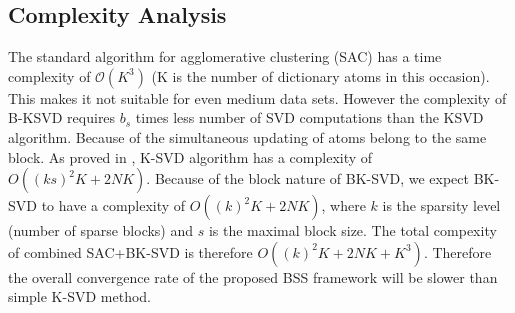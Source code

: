 \subsection{Complexity Analysis}
The standard algorithm for agglomerative clustering (SAC) has a time complexity of ${\displaystyle {\mathcal {O}}(K^{3})}$ (K is the number of dictionary atoms in this occasion). This makes it not suitable for even medium data sets. However the complexity of B-KSVD requires $b_s$ times less number of SVD computations than the KSVD algorithm. Because of the simultaneous updating of atoms belong to the same block.
As proved in \cite{OMP_KSVD}, K-SVD algorithm has a complexity of $O((ks)^2K + 2NK)$. Because of the block nature of BK-SVD, we expect BK-SVD to have a complexity of $O((k)^2K + 2NK)$, where $k$ is the sparsity level (number of sparse blocks) and $s$ is the maximal block size. The total compexity of combined SAC+BK-SVD is therefore $O((k)^2K + 2NK+K^3)$. Therefore the overall convergence rate of the proposed BSS framework will be slower than simple K-SVD method.\\

